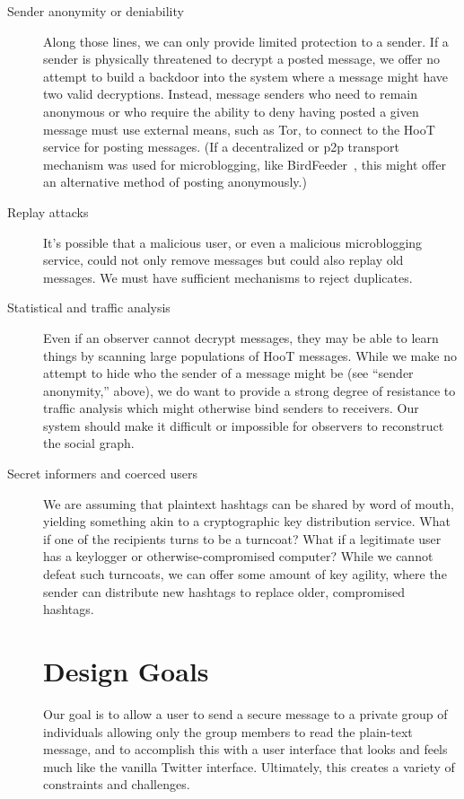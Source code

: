 \begin{description}
\item[Sender anonymity or deniability] Along those lines, we can only
  provide limited protection to a sender. If a sender is physically
  threatened to decrypt a posted message, we offer no attempt to build a
  backdoor into the system where a message might have two valid
  decryptions. Instead, message senders who need to remain anonymous or
  who require the ability to deny having posted a given message must use
  external means, such as Tor, to connect to the HooT service for
  posting messages. (If a decentralized or p2p transport mechanism was
  used for microblogging, like BirdFeeder~\cite{sandler08}, this might
  offer an alternative method of posting anonymously.)

\item[Replay attacks] It's possible that a malicious user, or even a
  malicious microblogging service, could not only remove messages but
  could also replay old messages. We must have sufficient mechanisms to
  reject duplicates.

\item[Statistical and traffic analysis] Even if an observer cannot
  decrypt messages, they may be able to learn things by scanning large
  populations of HooT messages. While we make no attempt to hide who the
  sender of a message might be (see ``sender anonymity,'' above), we do
  want to provide a strong degree of resistance to traffic analysis
  which might otherwise bind senders to receivers. Our system should
  make it difficult or impossible for observers to reconstruct the
  social graph.

\item[Secret informers and coerced users] We are assuming that plaintext
  hashtags can be shared by word of mouth, yielding something akin to a
  cryptographic key distribution service. What if one of the recipients
  turns to be a turncoat? What if a legitimate user has a keylogger or
  otherwise-compromised computer? While we cannot defeat such turncoats,
  we can offer some amount of key agility, where the sender can
  distribute new hashtags to replace older, compromised hashtags.

\section{Design Goals}

Our goal is to allow a user to send a secure message to a private group of individuals allowing only the group members to read the plain-text message, and to accomplish this with a user interface that looks and feels much like the vanilla Twitter interface. Ultimately, this creates a variety of constraints and challenges.


\end{description}
